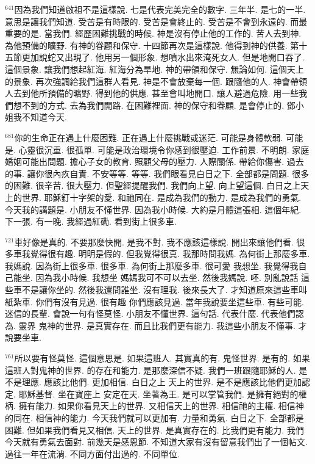 \documentclass{book}
\begin{document}
$^{641}$因為我們知道啟祖不是這樣說.
七是代表完美完全的數字.
三年半.
是七的一半.
意思是讓我們知道.
受苦是有時限的.
受苦是會終止的.
受苦是不會到永遠的.
而最重要的是.
當我們.
經歷困難挑戰的時候.
神是沒有停止他的工作的.
苦人去到神.
為他預備的曠野.
有神的眷顧和保守.
十四節再次是這樣說.
他得到神的供養.
第十五節更加說蛇又出現了.
他用另一個形象.
想噴水出來淹死女人.
但是地開口吞了.
這個景象.
讓我們想起紅海.
紅海分為旱地.
神的帶領和保守.
無論如何.
這個天上的景象.
再次強調給我們這群人看見.
神是不會放棄每一個.
跟隨他的人.
神會帶領人去到他所預備的曠野.
得到他的供應.
甚至會叫地開口.
讓人避過危險.
用一些我們想不到的方式.
去為我們開路.
在困難裡面.
神的保守和眷顧.
是會停止的.
鄧小姐我不知道今天.

$^{681}$你的生命正在遇上什麼困難.
正在遇上什麼挑戰或迷茫.
可能是身體軟弱.
可能是.
心靈很沉重.
很孤單.
可能是政治環境令你感到很壓迫.
工作前景.
不明朗.
家庭婚姻可能出問題.
擔心子女的教育.
照顧父母的壓力.
人際關係.
帶給你傷害.
過去的事.
讓你很內疚自責.
不安等等.
等等.
我們眼看見白日之下.
全部都是問題.
很多的困難.
很辛苦.
很大壓力.
但聖經提醒我們.
我們向上望.
向上望這個.
白日之上天上的世界.
耶穌釘十字架的愛.
和祂同在.
是成為我們的動力.
是成為我們的勇氣.
今天我的講題是.
小朋友不懂世界.
因為我小時候.
大約是月體這張相.
這個年紀.
下一張.
有一晚.
我經過紅磡.
看到街上很多車.

$^{721}$車好像是真的.
不要那麼快開.
是我不對.
我不應該這樣說.
開出來讓他們看.
很多車我覺得很有趣.
明明是假的.
但我覺得很真.
我那時問我媽.
為何街上那麼多車.
我媽說.
因為街上很多車.
很多車.
為何街上那麼多車.
很可愛 我想坐.
我覺得我自己能坐.
因為我小時候.
我想坐 媽媽我可不可以去坐.
然後我媽說.
呸.
別亂說話 這些車不是讓你坐的.
然後我還問誰坐.
沒有理我.
後來長大了.
才知道原來這些車叫紙紮車.
你們有沒有見過.
很有趣 你們應該見過.
當年我說要坐這些車.
有些可能.
迷信的長輩.
會說一句有怪莫怪.
小朋友不懂世界.
這句話.
代表什麼.
代表他們認為.
靈界 鬼神的世界.
是真實存在.
而且比我們更有能力.
我這些小朋友不懂事.
才說要坐車.

$^{761}$所以要有怪莫怪.
這個意思是.
如果這班人.
其實真的有.
鬼怪世界.
是有的.
如果這班人對鬼神的世界.
的存在和能力.
是那麼深信不疑.
我們一班跟隨耶穌的人.
是不是理應.
應該比他們.
更加相信.
白日之上 天上的世界.
是不是應該比他們更加認定.
耶穌基督.
坐在寶座上 安定在天.
坐著為王.
是可以掌管我們.
是擁有絕對的權柄.
擁有能力.
如果你看見天上的世界.
又相信天上的世界.
相信祂的主權.
相信神的同在.
相信神的能力.
今天我們就可以更加有.
力量和勇氣.
白日之下.
全部都是困難.
但如果我們看見又相信.
天上的世界.
是真實存在的.
比我們更有能力.
我們今天就有勇氣去面對.
前幾天是感恩節.
不知道大家有沒有留意我們出了一個帖文.
過往一年在流淌.
不同方面付出過的.
不同單位.
\end{document}
